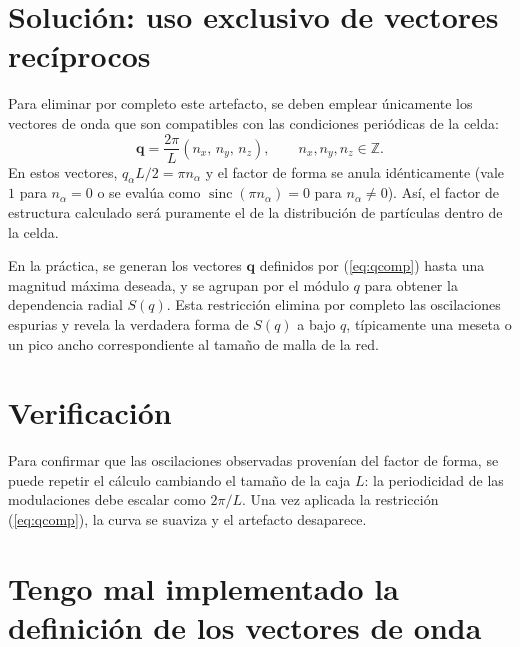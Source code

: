 \documentclass[../main.tex]{subfiles}
\begin{document}
\section{Solución: uso exclusivo de vectores recíprocos}

Para eliminar por completo este artefacto, se deben emplear únicamente los vectores de onda que son compatibles con las condiciones periódicas de la celda:
\begin{equation}
\mathbf{q} = \frac{2\pi}{L}(n_x,\, n_y,\, n_z),\qquad n_x,n_y,n_z \in \mathbb{Z}.
\label{eq:qcomp}
\end{equation}
En estos vectores, $q_\alpha L/2 = \pi n_\alpha$ y el factor de forma se anula idénticamente (vale $1$ para $n_\alpha=0$ o se evalúa como $\operatorname{sinc}(\pi n_\alpha) = 0$ para $n_\alpha \neq 0$). Así, el factor de estructura calculado será puramente el de la distribución de partículas dentro de la celda.

En la práctica, se generan los vectores $\mathbf{q}$ definidos por (\ref{eq:qcomp}) hasta una magnitud máxima deseada, y se agrupan por el módulo $q$ para obtener la dependencia radial $S(q)$. Esta restricción elimina por completo las oscilaciones espurias y revela la verdadera forma de $S(q)$ a bajo $q$, típicamente una meseta o un pico ancho correspondiente al tamaño de malla de la red.

\section{Verificación}

Para confirmar que las oscilaciones observadas provenían del factor de forma, se puede repetir el cálculo cambiando el tamaño de la caja $L$: la periodicidad de las modulaciones debe escalar como $2\pi/L$. Una vez aplicada la restricción (\ref{eq:qcomp}), la curva se suaviza y el artefacto desaparece.

\section{Tengo mal implementado la definición de los vectores de onda}
\end{document}
